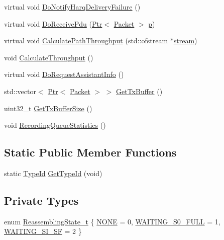 \begin{DoxyCompactItemize}
virtual void \hyperlink{classns3_1_1LteRlcUm_aa2e60c51b4d625fd6b2019b743c89928}{Do\+Notify\+Harq\+Delivery\+Failure} ()
\item 
virtual void \hyperlink{classns3_1_1LteRlcUm_aaba57757b1c5640b7bbe421efb82417a}{Do\+Receive\+Pdu} (\hyperlink{classns3_1_1Ptr}{Ptr}$<$ \hyperlink{classns3_1_1Packet}{Packet} $>$ \hyperlink{lte__link__budget__x2__handover__measures_8m_ac9de518908a968428863f829398a4e62}{p})
\item 
virtual void \hyperlink{classns3_1_1LteRlcUm_a54fff036c0cfaf8a314a375578f410bc}{Calculate\+Path\+Throughput} (std\+::ofstream $\ast$\hyperlink{classns3_1_1LteRlcUm_a8509783beb5d5625757bdf93549079f6}{stream})
\item 
void \hyperlink{classns3_1_1LteRlcUm_a36b2e6ac1128537564f8f19084cd0122}{Calculate\+Throughput} ()
\item 
virtual void \hyperlink{classns3_1_1LteRlcUm_a59e76c0cc98ee8140467ca4a338412a9}{Do\+Request\+Assistant\+Info} ()
\item 
std\+::vector$<$ \hyperlink{classns3_1_1Ptr}{Ptr}$<$ \hyperlink{classns3_1_1Packet}{Packet} $>$ $>$ \hyperlink{classns3_1_1LteRlcUm_a85f2e552cc7a048a195b338c633a0d25}{Get\+Tx\+Buffer} ()
\item 
uint32\+\_\+t \hyperlink{classns3_1_1LteRlcUm_aa88fc55de6c2f858e0e2952131899afc}{Get\+Tx\+Buffer\+Size} ()
\item 
void \hyperlink{classns3_1_1LteRlcUm_a7967ba7b2cf55092391ef32bd19dcd1f}{Recording\+Queue\+Statistics} ()
\end{DoxyCompactItemize}
\subsection*{Static Public Member Functions}
\begin{DoxyCompactItemize}
\item 
static \hyperlink{classns3_1_1TypeId}{Type\+Id} \hyperlink{classns3_1_1LteRlcUm_a119b2b1273c42483a050896d5232829d}{Get\+Type\+Id} (void)
\end{DoxyCompactItemize}
\subsection*{Private Types}
\begin{DoxyCompactItemize}
\item 
enum \hyperlink{classns3_1_1LteRlcUm_ae16a0c69b1e6723a7e1f633b53768cd6}{Reassembling\+State\+\_\+t} \{ \hyperlink{classns3_1_1LteRlcUm_ae16a0c69b1e6723a7e1f633b53768cd6a8917b9b979705115692b505de8098394}{N\+O\+NE} = 0, 
\hyperlink{classns3_1_1LteRlcUm_ae16a0c69b1e6723a7e1f633b53768cd6a24c0e966f1047b74bdbf41fe20b3632b}{W\+A\+I\+T\+I\+N\+G\+\_\+\+S0\+\_\+\+F\+U\+LL} = 1, 
\hyperlink{classns3_1_1LteRlcUm_ae16a0c69b1e6723a7e1f633b53768cd6a84f16b5b0883130f08f944fb996c22ac}{W\+A\+I\+T\+I\+N\+G\+\_\+\+S\+I\+\_\+\+SF} = 2
 \}
\end{DoxyCompactItemize}
